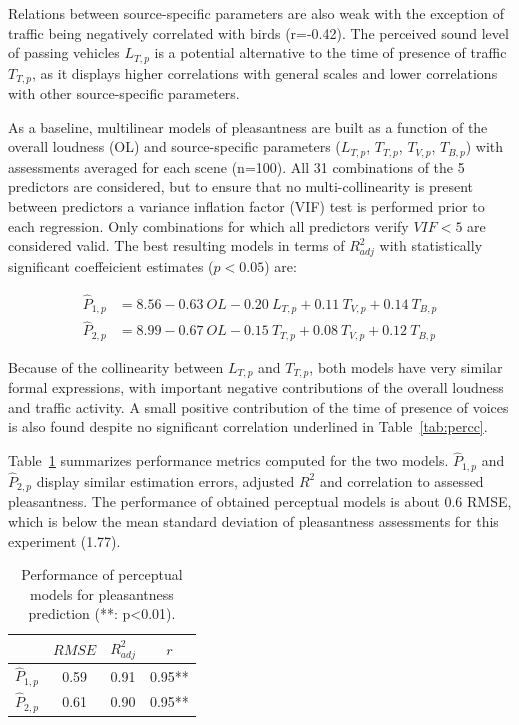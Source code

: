 \documentclass[11pt,a4paper]{article}
\begin{document}
Relations between source-specific parameters are also weak with the exception of traffic being negatively correlated with birds (r=-0.42). The perceived sound level of passing vehicles $L_{T, p}$ is a potential alternative to the time of presence of traffic $T_{T, p}$, as it displays higher correlations with general scales and lower correlations with other source-specific parameters.

As a baseline, multilinear models of pleasantness are built as a function of the overall loudness (OL) and source-specific parameters ($L_{T, p}$, $T_{T, p}$, $T_{V, p}$, $T_{B, p}$) with assessments averaged for each scene (n=100). All 31 combinations of the 5 predictors are considered, but to ensure that no multi-collinearity is present between predictors a variance inflation factor (VIF) test is performed prior to each regression. Only combinations for which all predictors verify $VIF<5$ are considered valid. The best resulting models in terms of $R^2_{adj}$ with statistically significant coeffeicient estimates ($p<0.05$) are:

\begin{align}
\hat P_{1, p} &= 8.56 - 0.63~OL - 0.20~L_{T, p} + 0.11~T_{V, p} + 0.14~T_{B, p} \label{eq:pp1}\\
\hat P_{2, p} &= 8.99 - 0.67~OL - 0.15~T_{T, p} + 0.08~T_{V, p} + 0.12~T_{B, p} \label{eq:pp2}
\end{align}

Because of the collinearity between $L_{T, p}$ and $T_{T, p}$, both models have very similar formal expressions, with important negative contributions of the overall loudness and traffic activity. A small positive contribution of the time of presence of voices is also found despite no significant correlation underlined in Table~\ref{tab:percc}.

Table~\ref{tab:percm} summarizes performance metrics computed for the two models. $\hat P_{1, p}$ and $\hat P_{2, p}$ display similar estimation errors, adjusted $R^2$ and correlation to assessed pleasantness. The performance of obtained perceptual models is about 0.6 RMSE, which is below the mean standard deviation of pleasantness assessments for this experiment (1.77).

\begin{table}[t]
\centering
\caption{Performance of perceptual models for pleasantness prediction (**: p<0.01).}
\label{tab:percm}
\begin{tabular}{ c | c | c | c }
\hline
	 & $RMSE$ & $R^2_{adj}$ & $r$ \\ \hline
	$\hat P_{1, p}$ & 0.59 & 0.91 & 0.95** \\
	$\hat P_{2, p}$ & 0.61 & 0.90 & 0.95** \\ \hline
\end{tabular}
\end{table}
\end{document}
